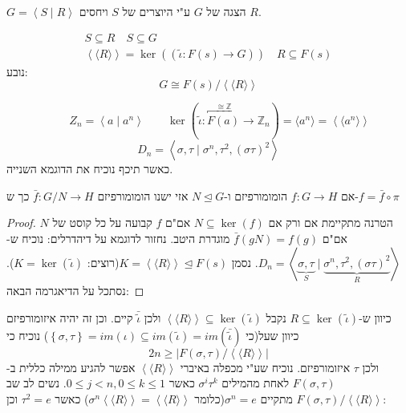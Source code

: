 \documentclass{tstextbook}
\begin{document}
\begin{symbolize}
\(G=\left\langle  S\mid R  \right\rangle\) הצגה של \(G\) ע"י היוצרים של \(S\) ויחסים \(R\). 

$$\begin{gathered}S\subseteq R\quad S\subseteq G \\\left\langle  \langle R\rangle  \right\rangle =\ker\left( \left( \tilde{\iota}:F(s)\to G \right) \right)\quad R\subseteq F(s)
\end{gathered}$$
נובע:
$$G\cong F(s) / \left\langle  \langle R\rangle  \right\rangle$$

\end{symbolize}
\begin{example}
$$\qquad Z_{n}=\left\langle  a\mid a^n \right\rangle \qquad \ker\left( \tilde{\iota}:\overbracket{ F(a) }^{ \cong\mathbb{Z}  }\to \mathbb{Z} _{n} \right) = \langle a^n\rangle =\left\langle  \langle a^n\rangle  \right\rangle$$$$D_{n}=\left\langle  \sigma,\tau \mid \sigma^n,\tau^2,\left( \sigma \tau \right)^2 \right\rangle$$
כאשר תיכף נוכיח את הדוגמא השנייה.

\end{example}
\begin{proposition}
אם \(f:G\to H\) הומומורפיזם ו-\(N\trianglelefteq  G\) אזי ישנו הומומורפיזם \(\bar{f}:G / N\to H\) כך ש-\(f=\bar{f}\circ \pi\)

\end{proposition}
\begin{proof}
הטרנה מתקיימת אם ורק אם \(N\subseteq \ker(f)\) אם"ם \(f\) קבועה על כל קוסט של \(N\) אם"ם \(\bar{f}(gN)=f(g)\) מוגדרת היטב. נחזור לדוגמא על דיהדרלים: נוכיח ש-\(D_{n}=\left\langle  \underbrace{ \sigma,\tau }_{ S } \mid \underbrace{ \sigma^n,\tau^2,\left( \sigma \tau \right)^2 }_{ R }  \right\rangle\). נסמן \(K=\left\langle  \langle R\rangle\right\rangle \trianglelefteq F(s)\)(רוצים: \(K=\ker\left( \tilde{\iota} \right)\)). נסתכל על הדיאגרמה הבאה:

\end{proof}
כיוון ש-\(R\subseteq \ker\left( \tilde{\iota} \right)\) נקבל \(\left\langle  \langle R\rangle\right\rangle\subseteq \ker\left( \tilde{\iota} \right)\) ולכן \(\bar{\tilde{\iota}}\) קיים. וכן זה יהיה איזומורפיזם כיוון שעל(כי \(\left\{  \sigma,\tau  \right\}=im\left( \iota \right)\subseteq im\left( \tilde{\iota} \right)=im\left( \bar{\tilde{\iota}} \right)\)) נוכיח כי
$$2n\geq |F\left( \sigma,\tau \right) / \left\langle  \langle R\rangle  \right\rangle |$$
ולכן \(\tau\) איזומורפיזם. נוכיח שע"י מכפלה באיברי \(\left\langle  \langle R\rangle\right\rangle\) אפשר להגיע ממילה כללית ב-\(F\left( \sigma,\tau \right)\) לאחת מהמילים \(\sigma^i\tau^k\) כאשר \(0\leq j<n, 0\leq k\leq 1\). נשים לב שב \(F\left( \sigma,\tau \right) / \left\langle \langle R\rangle\right\rangle\) מתקיים \(\sigma^n=e\)(כלומר \(\sigma^n\left\langle \langle R\rangle\right\rangle=\left\langle  \langle R\rangle  \right\rangle\)) כאשר \(\tau^2=e\) וכן:
\end{document}
